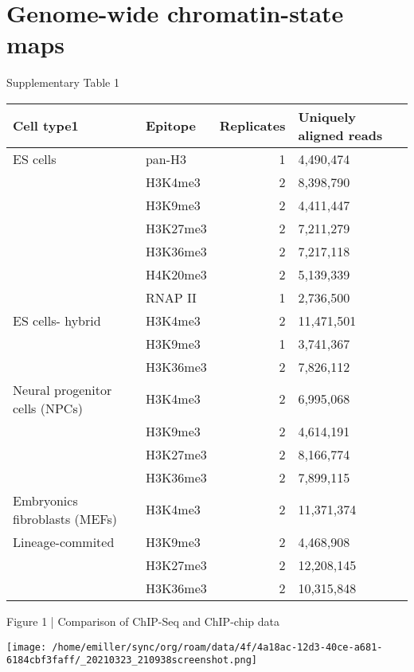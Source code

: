 \documentclass[bigger]{beamer}
\begin{document}
\section{Genome-wide chromatin-state maps}
\label{sec:orgff98a94}
\begin{frame}[label={sec:org58b31a9},shrink=10]{Supplementary Table 1}
\begin{center}
\begin{tabular}{llrl}
Cell type1 & Epitope & Replicates & Uniquely aligned reads\\
\hline
ES cells & pan-H3 & 1 & 4,490,474\\
 & H3K4me3 & 2 & 8,398,790\\
 & H3K9me3 & 2 & 4,411,447\\
 & H3K27me3 & 2 & 7,211,279\\
 & H3K36me3 & 2 & 7,217,118\\
 & H4K20me3 & 2 & 5,139,339\\
 & RNAP II & 1 & 2,736,500\\
\hline
ES cells- hybrid & H3K4me3 & 2 & 11,471,501\\
 & H3K9me3 & 1 & 3,741,367\\
 & H3K36me3 & 2 & 7,826,112\\
\hline
Neural progenitor cells (NPCs) & H3K4me3 & 2 & 6,995,068\\
 & H3K9me3 & 2 & 4,614,191\\
 & H3K27me3 & 2 & 8,166,774\\
 & H3K36me3 & 2 & 7,899,115\\
\hline
Embryonics fibroblasts (MEFs) & H3K4me3 & 2 & 11,371,374\\
Lineage-commited & H3K9me3 & 2 & 4,468,908\\
 & H3K27me3 & 2 & 12,208,145\\
 & H3K36me3 & 2 & 10,315,848\\
\end{tabular}
\end{center}
\end{frame}

\begin{frame}[label={sec:orge45a040}]{Figure 1 | Comparison of ChIP-Seq and ChIP-chip data}
\begin{center}
\texttt{[image: /home/emiller/sync/org/roam/data/4f/4a18ac-12d3-40ce-a681-6184cbf3faff/\_20210323\_210938screenshot.png]}
\end{center}
\end{frame}
\end{document}
